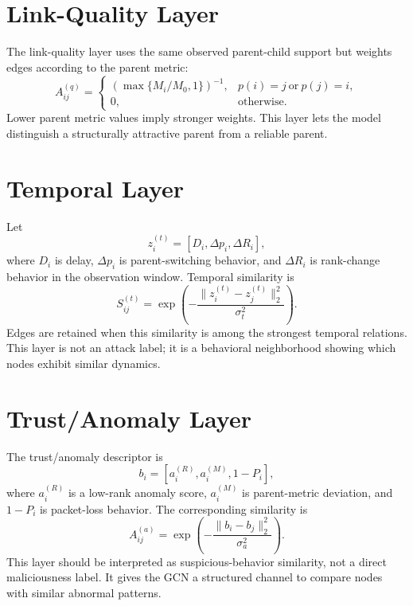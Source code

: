 \documentclass[10pt]{article}
\begin{document}
\section{Link-Quality Layer}
The link-quality layer uses the same observed parent-child support but weights edges according to the parent metric:
\begin{equation}
A^{(q)}_{ij}=
\begin{cases}
\left(\max\{M_i/M_0,1\}\right)^{-1},&
p(i)=j\ \mathrm{or}\ p(j)=i,\\
0,&\mathrm{otherwise}.
\end{cases}
\label{eq:app2_quality}
\end{equation}
Lower parent metric values imply stronger weights. This layer lets the model distinguish a structurally attractive parent from a reliable parent.

\section{Temporal Layer}
Let
\begin{equation}
z_i^{(t)}=[D_i,\Delta p_i,\Delta R_i],
\label{eq:app2_temporal_descriptor}
\end{equation}
where $D_i$ is delay, $\Delta p_i$ is parent-switching behavior, and $\Delta R_i$ is rank-change behavior in the observation window. Temporal similarity is
\begin{equation}
S^{(t)}_{ij}=
\exp\left(-\frac{\|z_i^{(t)}-z_j^{(t)}\|_2^2}{\sigma_t^2}\right).
\label{eq:app2_temporal_similarity}
\end{equation}
Edges are retained when this similarity is among the strongest temporal relations. This layer is not an attack label; it is a behavioral neighborhood showing which nodes exhibit similar dynamics.

\section{Trust/Anomaly Layer}
The trust/anomaly descriptor is
\begin{equation}
b_i=[a_i^{(R)},a_i^{(M)},1-P_i],
\label{eq:app2_anomaly_descriptor}
\end{equation}
where $a_i^{(R)}$ is a low-rank anomaly score, $a_i^{(M)}$ is parent-metric deviation, and $1-P_i$ is packet-loss behavior. The corresponding similarity is
\begin{equation}
A^{(a)}_{ij}=
\exp\left(-\frac{\|b_i-b_j\|_2^2}{\sigma_a^2}\right).
\label{eq:app2_anomaly}
\end{equation}
This layer should be interpreted as suspicious-behavior similarity, not a direct maliciousness label. It gives the GCN a structured channel to compare nodes with similar abnormal patterns.
\end{document}

